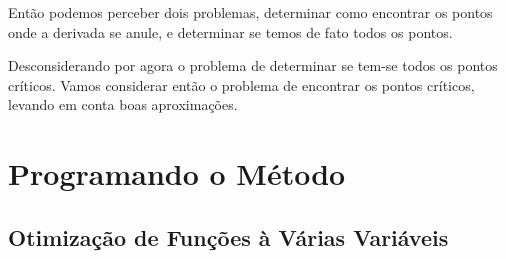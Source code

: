 Então podemos perceber dois problemas, determinar como encontrar os pontos onde
a derivada se anule, e determinar se temos de fato todos os pontos.

Desconsiderando por agora o problema de determinar se tem-se todos os pontos
críticos. Vamos considerar então o problema de encontrar os pontos críticos,
levando em conta boas aproximações.


\section{{Programando o Método}}

\hspace{0.8cm}


\textcolor[rgb]{1,0,0}{\section{{Otimização de Funções à Várias Variáveis}}}

\hspace{0.8cm}





%
